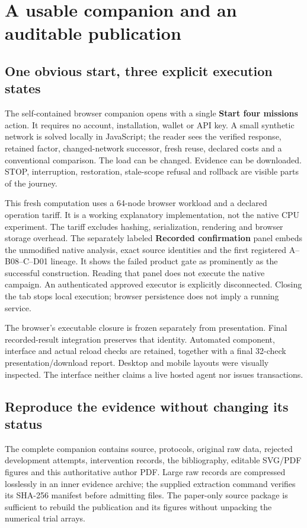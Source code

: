 \section{A usable companion and an auditable publication}
\label{sec:reproduce}

\subsection{One obvious start, three explicit execution states}

The self-contained browser companion opens with a single \textbf{Start four missions} action. It requires no
account, installation, wallet or API key. A small synthetic network is solved locally in JavaScript; the
reader sees the verified response, retained factor, changed-network successor, fresh reuse, declared costs
and a conventional comparison. The load can be changed. Evidence can be downloaded. STOP, interruption,
restoration, stale-scope refusal and rollback are visible parts of the journey.

This fresh computation uses a 64-node browser workload and a declared operation tariff. It is a working
explanatory implementation, not the native CPU experiment. The tariff excludes hashing, serialization,
rendering and browser storage overhead. The separately labeled \textbf{Recorded confirmation} panel embeds
the unmodified native analysis, exact source identities and the first registered A--B08--C--D01 lineage.
It shows the failed product gate as prominently as the successful construction. Reading that panel does
not execute the native campaign. An authenticated approved executor is explicitly disconnected. Closing
the tab stops local execution; browser persistence does not imply a running service.

The browser's executable closure is frozen separately from presentation. Final recorded-result integration
preserves that identity. Automated component, interface and actual reload checks are retained, together
with a final 32-check presentation/download report. Desktop and mobile layouts were visually inspected.
The interface neither claims a live hosted agent nor issues transactions.

\subsection{Reproduce the evidence without changing its status}

The complete companion contains source, protocols, original raw data, rejected development attempts,
intervention records, the bibliography, editable SVG/PDF figures and this authoritative author PDF.
Large raw records are compressed losslessly in an inner evidence archive; the supplied extraction command
verifies its SHA-256 manifest before admitting files. The paper-only source package is sufficient to rebuild
the publication and its figures without unpacking the numerical trial arrays.

